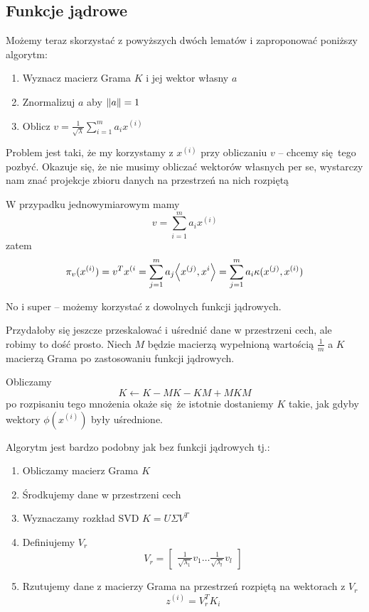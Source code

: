 \subsection{Funkcje jądrowe}
Możemy teraz skorzystać z powyższych dwóch lematów i zaproponować poniższy algorytm:
\begin{enumerate}
	\item Wyznacz macierz Grama \( K \) i jej wektor własny \( a \)
	\item Znormalizuj \( a \) aby \( \left\Vert a \right\Vert = 1 \)
	\item Oblicz \( v = \frac{1}{\sqrt{\lambda}} \sum_{i=1}^m a_i x^{(i)} \)
\end{enumerate}

Problem jest taki, że my korzystamy z \( x^{(i)} \) przy obliczaniu \( v \) -- chcemy się tego pozbyć.
Okazuje się, że nie musimy obliczać wektorów własnych per se, wystarczy nam znać projekcje zbioru danych na przestrzeń na nich rozpiętą

W przypadku jednowymiarowym mamy
\[
	v = \sum_{i=1}^m a_i x^{(i)}
\]
zatem
\[
	\pi_v(x^{(i)}) = v^Tx^{(i} = \sum_{j=1}^m a_j\dotproduct{x^{(j)}, x^{i}} =
	\sum_{j=1}^m a_i \kappa(x^{(j)}, x^{(i)})
\]

No i super -- możemy korzystać z dowolnych funkcji jądrowych.

Przydałoby się jeszcze przeskalować i uśrednić dane w przestrzeni cech, ale robimy to dość prosto.
Niech \( M \) będzie macierzą wypełnioną wartością \( \frac{1}{m} \) a \( K \) macierzą Grama po zastosowaniu funkcji jądrowych.

Obliczamy
\[
	K \leftarrow K - MK - KM + MKM
\]
po rozpisaniu tego mnożenia okaże się że istotnie dostaniemy \( K \) takie, jak gdyby wektory \( \phi(x^{(i)}) \) były uśrednione.

Algorytm jest bardzo podobny jak bez funkcji jądrowych tj.:
\begin{enumerate}
	\item Obliczamy macierz Grama \( K \)
	\item Środkujemy dane w przestrzeni cech
	\item Wyznaczamy rozkład SVD \( K = U\Sigma V^T \)
	\item Definiujemy \( V_r \)
	      \[
		      V_r = \begin{bmatrix}
			      \frac{1}{\sqrt{\lambda_1}} v_1 \hdots \frac{1}{\sqrt{\lambda_l}} v_l
		      \end{bmatrix}
	      \]
	\item Rzutujemy dane z macierzy Grama na przestrzeń rozpiętą na wektorach z \( V_r \)
	      \[
		      z^{(i)} = V_r^T K_i
	      \]
\end{enumerate}